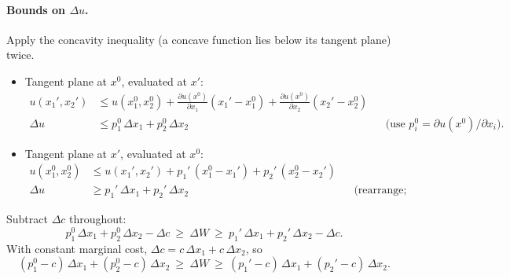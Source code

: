 \paragraph{Bounds on $\Delta u$.} Apply the concavity inequality (a concave function lies below its tangent plane) twice.
\begin{itemize}
\item Tangent plane at $x^0$, evaluated at $x'$:
\begin{align*}
u(x_1',x_2')&\le u(x_1^0,x_2^0)+\frac{\partial u(x^0)}{\partial x_1}(x_1'-x_1^0)+\frac{\partial u(x^0)}{\partial x_2}(x_2'-x_2^0)\\
\Delta u&\le p_1^0\,\Delta x_1+p_2^0\,\Delta x_2 &&\text{(use $p_i^0=\partial u(x^0)/\partial x_i$).}
\end{align*}
\item Tangent plane at $x'$, evaluated at $x^0$:
\begin{align*}
u(x_1^0,x_2^0)&\le u(x_1',x_2')+p_1'\,(x_1^0-x_1')+p_2'\,(x_2^0-x_2')\\
\Delta u&\ge p_1'\,\Delta x_1+p_2'\,\Delta x_2 &&\text{(rearrange; flip signs).}
\end{align*}
\end{itemize}
Subtract $\Delta c$ throughout:
\[
p_1^0\,\Delta x_1+p_2^0\,\Delta x_2-\Delta c\ \ge\ \Delta W\ \ge\ p_1'\,\Delta x_1+p_2'\,\Delta x_2-\Delta c .
\]
With constant marginal cost, $\Delta c=c\,\Delta x_1+c\,\Delta x_2$, so
\begin{equation}\label{eq:micro-wbounds}
(p_1^0-c)\,\Delta x_1+(p_2^0-c)\,\Delta x_2\ \ge\ \Delta W\ \ge\ (p_1'-c)\,\Delta x_1+(p_2'-c)\,\Delta x_2 .
\end{equation}

